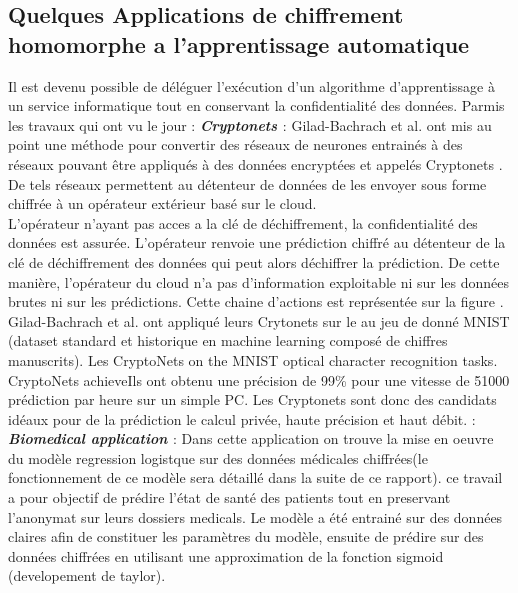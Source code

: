 \documentclass[a4paper,12pt]{article}
\begin{document}
\subsection{Quelques Applications de chiffrement homomorphe a l'apprentissage automatique}
Il est devenu possible de déléguer l'exécution d'un algorithme d'apprentissage à un service informatique tout en conservant la confidentialité des données. \newline
Parmis les travaux qui ont vu le jour  :\newline
\textbf{\textit{Cryptonets \cite{1gilad2016cryptonets} }} :  \newline
Gilad-Bachrach et al. ont mis au point une méthode pour convertir des réseaux de neurones entrainés à des réseaux pouvant être appliqués à des données encryptées et appelés Cryptonets \cite{1gilad2016cryptonets}.
De tels réseaux permettent au détenteur de données de les envoyer sous forme chiffrée à un opérateur extérieur basé sur le cloud.\\
L'opérateur n'ayant pas acces a la clé de déchiffrement, la confidentialité des données est assurée.
L'opérateur renvoie une prédiction chiffré au détenteur de la clé de déchiffrement des données qui peut alors déchiffrer la prédiction. De cette manière, l'opérateur du cloud n'a pas d'information exploitable ni sur les données brutes ni sur les prédictions. Cette chaine d'actions est représentée sur la figure \cite{delahaye_PLS}. \\
Gilad-Bachrach et al.  ont appliqué leurs Crytonets sur le au jeu de donné MNIST (dataset standard et historique en machine learning composé de chiffres manuscrits).
Les CryptoNets
on the MNIST optical character recognition tasks. CryptoNets achieveIls ont obtenu une précision de 99\% pour une vitesse de 51000 prédiction par heure sur un simple PC. Les Cryptonets sont donc des candidats idéaux pour de la prédiction le calcul privée, haute précision et haut débit.\textit{ \cite{dowlin2017manual} } :\newline
\textbf{\textit{Biomedical application \cite{1gilad2016cryptonets} }} :  \newline
Dans cette application on trouve la mise en oeuvre du modèle  regression logistque sur des données médicales  chiffrées(le fonctionnement de ce modèle sera détaillé dans la suite de ce rapport). ce travail a pour objectif de prédire l'état de santé des patients tout en preservant l'anonymat sur leurs dossiers medicals.\newline
Le modèle a été entrainé sur des données claires afin de constituer les paramètres du modèle, ensuite de prédire sur des données chiffrées en utilisant une approximation de la fonction sigmoid (developement de taylor). 
\end{document}
